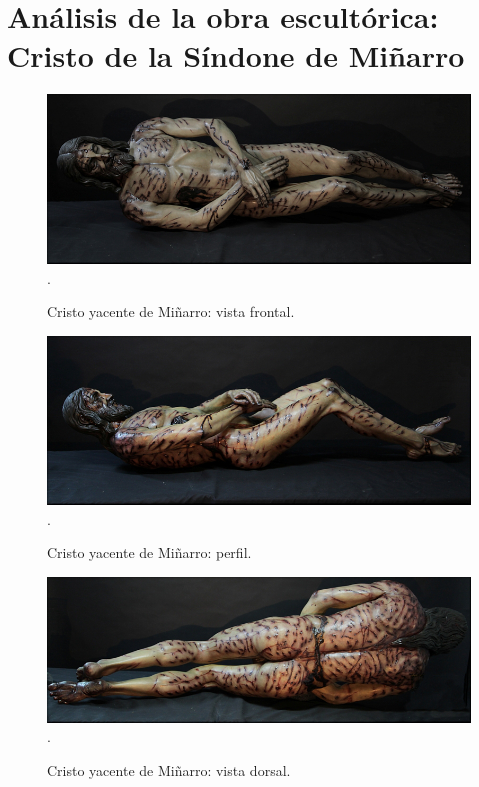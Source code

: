 \section{Análisis de la obra escultórica: Cristo de la Síndone de Miñarro} 

\begin{figure}[ht!]
    \centering
    \includegraphics[width=1.0\textwidth]{minarro1.jpg}
   .\caption{Cristo yacente de Miñarro: vista frontal.} %
\end{figure}

\begin{figure}[ht!]
    \centering
    \includegraphics[width=1.0\textwidth]{minarro2.jpg}
   .\caption{Cristo yacente de Miñarro: perfil.} %
\end{figure}

\begin{figure}[ht!]
    \centering
    \includegraphics[width=1.0\textwidth]{minarro3.jpg}
   .\caption{Cristo yacente de Miñarro: vista dorsal.} %
\end{figure}

